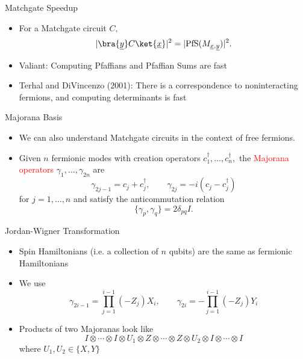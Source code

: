 \documentclass[xcolor=dvipsnames]{beamer}
\begin{document}
\begin{frame}{Matchgate Speedup}
  \begin{itemize}
    \item For a Matchgate circuit $C,$ 
    \[|\bra{\underline{y}}C\ket{\underline{x}}|^2=|\text{PfS}(M_{\underline{x},\underline{y}})|^2.\]
    \item Valiant: Computing Pfaffians and Pfaffian Sums are fast
    \item Terhal and DiVincenzo (2001): There is a correspondence to noninteracting fermions, and computing determinants is fast
  \end{itemize}
\end{frame}

\begin{frame}{Majorana Basis}
  \begin{itemize}
    \item We can also understand Matchgate circuits in the context of free fermions. 
    \item Given $n$ fermionic modes with creation operators $c_1^\dagger,\ldots,c_n^\dagger,$ the \textcolor{red}{Majorana operators} $\gamma_1,\ldots,\gamma_{2n}$ are 
    \[\gamma_{2j-1}=c_j+c_j^\dagger,\qquad\gamma_{2j}=-i(c_j-c_j^\dagger)\]
    for $j=1,\ldots,n$ and satisfy the anticommutation relation
    \[\{\gamma_p,\gamma_q\}=2\delta_{pq}I.\]
  \end{itemize}
\end{frame}

\begin{frame}{Jordan-Wigner Transformation}
  \begin{itemize}
    \item Spin Hamiltonians (i.e. a collection of $n$ qubits) are the same as fermionic Hamiltonians
    \item We use
    \[\gamma_{2i-1}=\prod_{j=1}^{i-1}(-Z_j)X_i,\qquad\gamma_{2i}=-\prod_{j=1}^{i-1}(-Z_j)Y_i\]
    \item Products of two Majoranas look like
    \[I\otimes\cdots\otimes I\otimes U_1\otimes Z\otimes\cdots\otimes Z\otimes U_2\otimes I\otimes\cdots\otimes I\]
    where $U_1,U_2\in\{X,Y\}$
  \end{itemize}
\end{frame}
\end{document}
